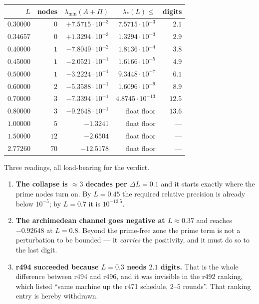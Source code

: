 \documentclass[11pt]{article}
\theoremstyle{remark}
\begin{document}
\begin{center}
\small
\begin{tabular}{@{}rrrrr@{}}
\toprule
$L$ & nodes & $\lambda_{\min}(A+\Pi)$
  & $\lambda_*(L)\le$ & digits \\
\midrule
$0.30000$ & $0$ & $+7.5715\cdot10^{-3}$ & $7.5715\cdot10^{-3}$ & $2.1$ \\
$0.34657$ & $0$ & $+1.3294\cdot10^{-3}$ & $1.3294\cdot10^{-3}$ & $2.9$ \\
$0.40000$ & $1$ & $-7.8049\cdot10^{-2}$ & $1.8136\cdot10^{-4}$ & $3.8$ \\
$0.45000$ & $1$ & $-2.0521\cdot10^{-1}$ & $1.6166\cdot10^{-5}$ & $4.9$ \\
$0.50000$ & $1$ & $-3.2224\cdot10^{-1}$ & $9.3448\cdot10^{-7}$ & $6.1$ \\
$0.60000$ & $2$ & $-5.3588\cdot10^{-1}$ & $1.6096\cdot10^{-9}$ & $8.9$ \\
$0.70000$ & $3$ & $-7.3394\cdot10^{-1}$ & $4.8745\cdot10^{-13}$ & $12.5$ \\
$0.80000$ & $3$ & $-9.2648\cdot10^{-1}$ & float floor & $13.6$ \\
$1.00000$ & $5$ & $-1.3241$ & float floor & --- \\
$1.50000$ & $12$ & $-2.6504$ & float floor & --- \\
$2.77260$ & $70$ & $-12.5178$ & float floor & --- \\
\bottomrule
\end{tabular}
\end{center}

Three readings, all load-bearing for the verdict.

\begin{enumerate}
\item \textbf{The collapse is $\approx3$ decades per $\Delta L=0.1$}
and it starts exactly where the prime nodes turn on.  By $L=0.45$ the
required relative precision is already below $10^{-5}$; by $L=0.7$ it
is $10^{-12.5}$.
\item \textbf{The archimedean channel goes negative at $L\approx0.37$}
and reaches $-0.92648$ at $L=0.8$.  Beyond the prime-free zone the
prime term is not a perturbation to be bounded --- it \emph{carries}
the positivity, and it must do so to the last digit.
\item \textbf{r494 succeeded because $L=0.3$ needs $2.1$ digits.}
That is the whole difference between r494 and r496, and it was
invisible in the r492 ranking, which listed ``same machine up the
r471 schedule, $2$--$5$ rounds''.  That ranking entry is hereby
withdrawn.
\end{enumerate}
\end{document}
